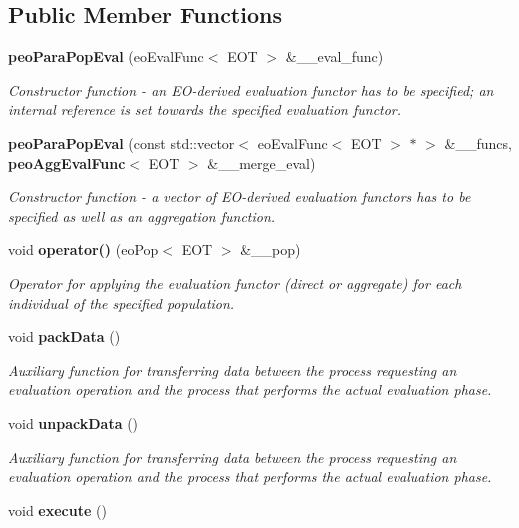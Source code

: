 \subsection*{Public Member Functions}
\begin{CompactItemize}
\item 
{\bf peo\-Para\-Pop\-Eval} (eo\-Eval\-Func$<$ EOT $>$ \&\_\-\_\-eval\_\-func)
\begin{CompactList}\small\item\em Constructor function - an EO-derived evaluation functor has to be specified; an internal reference is set towards the specified evaluation functor. \item\end{CompactList}\item 
{\bf peo\-Para\-Pop\-Eval} (const std::vector$<$ eo\-Eval\-Func$<$ EOT $>$ $\ast$ $>$ \&\_\-\_\-funcs, {\bf peo\-Agg\-Eval\-Func}$<$ EOT $>$ \&\_\-\_\-merge\_\-eval)
\begin{CompactList}\small\item\em Constructor function - a vector of EO-derived evaluation functors has to be specified as well as an aggregation function. \item\end{CompactList}\item 
void {\bf operator()} (eo\-Pop$<$ EOT $>$ \&\_\-\_\-pop)
\begin{CompactList}\small\item\em Operator for applying the evaluation functor (direct or aggregate) for each individual of the specified population. \item\end{CompactList}\item 
void {\bf pack\-Data} ()
\begin{CompactList}\small\item\em Auxiliary function for transferring data between the process requesting an evaluation operation and the process that performs the actual evaluation phase. \item\end{CompactList}\item 
void {\bf unpack\-Data} ()
\begin{CompactList}\small\item\em Auxiliary function for transferring data between the process requesting an evaluation operation and the process that performs the actual evaluation phase. \item\end{CompactList}\item 
void {\bf execute} ()\label{classpeo_para_pop_eval_3af76378611eac5a36da9a0a00aeeb6c}


\end{CompactItemize}
